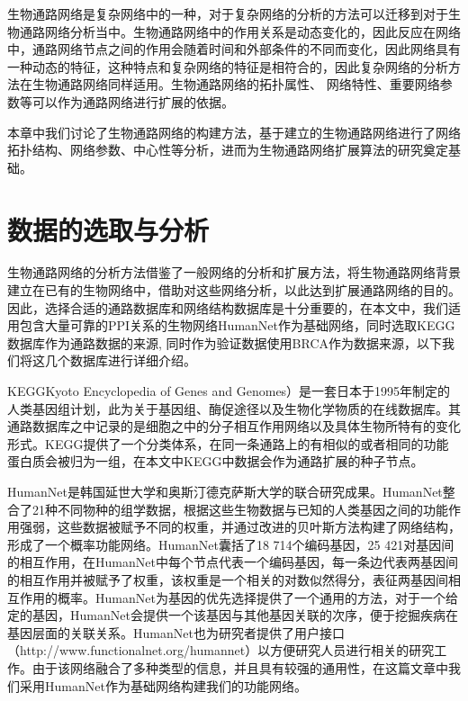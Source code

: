 生物通路网络是复杂网络中的一种，对于复杂网络的分析的方法可以迁移到对于生物通路网络分析当中。生物通路网络中的作用关系是动态变化的，因此反应在网络中，通路网络节点之间的作用会随着时间和外部条件的不同而变化，因此网络具有一种动态的特征，这种特点和复杂网络的特征是相符合的，因此复杂网络的分析方法在生物通路网络同样适用。生物通路网络的拓扑属性、 网络特性、重要网络参数等可以作为通路网络进行扩展的依据。

本章中我们讨论了生物通路网络的构建方法，基于建立的生物通路网络进行了网络拓扑结构、网络参数、中心性等分析，进而为生物通路网络扩展算法的研究奠定基础。

\section{数据的选取与分析}
生物通路网络的分析方法借鉴了一般网络的分析和扩展方法，将生物通路网络背景建立在已有的生物网络中，借助对这些网络分析，以此达到扩展通路网络的目的。因此，选择合适的通路数据库和网络结构数据库是十分重要的，在本文中，我们适用包含大量可靠的PPI关系的生物网络HumanNet\cite{lee2011prioritizing}作为基础网络，同时选取KEGG\cite{kanehisa2008kegg}数据库作为通路数据的来源, 同时作为验证数据使用BRCA作为数据来源，以下我们将这几个数据库进行详细介绍。

KEGG\cite{kanehisa2008kegg}Kyoto Encyclopedia of Genes and Genomes）是一套日本于1995年制定的人类基因组计划，此为关于基因组、酶促途径以及生物化学物质的在线数据库。其通路数据库之中记录的是细胞之中的分子相互作用网络以及具体生物所特有的变化形式。KEGG\cite{kanehisa2008kegg}提供了一个分类体系，在同一条通路上的有相似的或者相同的功能蛋白质会被归为一组，在本文中KEGG中数据会作为通路扩展的种子节点。

HumanNet\cite{lee2011prioritizing}是韩国延世大学和奥斯汀德克萨斯大学的联合研究成果。HumanNet\cite{lee2011prioritizing}整合了21种不同物种的组学数据，根据这些生物数据与已知的人类基因之间的功能作用强弱，这些数据被赋予不同的权重，并通过改进的贝叶斯方法构建了网络结构，形成了一个概率功能网络。HumanNet囊括了18 714个编码基因，25 421对基因间的相互作用，在HumanNet中每个节点代表一个编码基因，每一条边代表两基因间的相互作用并被赋予了权重，该权重是一个相关的对数似然得分，表征两基因间相互作用的概率。HumanNet为基因的优先选择提供了一个通用的方法，对于一个给定的基因，HumanNet会提供一个该基因与其他基因关联的次序，便于挖掘疾病在基因层面的关联关系。HumanNet也为研究者提供了用户接口（http://www.functionalnet.org/humannet）以方便研究人员进行相关的研究工作。由于该网络融合了多种类型的信息，并且具有较强的通用性，在这篇文章中我们采用HumanNet作为基础网络构建我们的功能网络。

